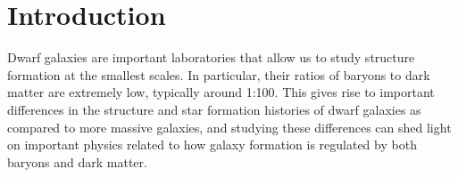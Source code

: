 \documentclass[iop]{emulateapj}
\begin{document}




\section{Introduction}
\label{intro}

Dwarf galaxies are important laboratories that allow us to study structure formation at the smallest scales. In particular, their ratios of baryons to dark matter are extremely low, typically around 1:100. This gives rise to important differences in the structure and star formation histories of dwarf galaxies as compared to more massive galaxies, and studying these differences can shed light on important physics related to how galaxy formation is regulated by both baryons and dark matter.
\end{document}
